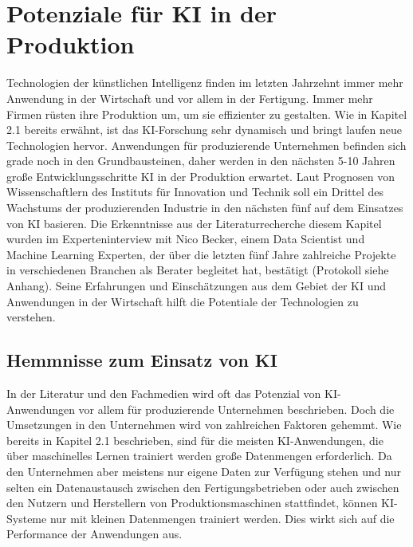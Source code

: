 \documentclass[a4paper,12pt, german]{report}
\begin{document}
\chapter{Potenziale für KI in der Produktion}
Technologien der künstlichen Intelligenz finden im letzten Jahrzehnt immer mehr Anwendung in der Wirtschaft und vor allem in der Fertigung. Immer mehr Firmen rüsten ihre Produktion um, um sie effizienter zu gestalten. Wie in Kapitel 2.1 bereits erwähnt, ist das KI-Forschung sehr dynamisch und bringt laufen neue Technologien hervor. Anwendungen für produzierende Unternehmen befinden sich grade noch in den Grundbausteinen, daher werden in den nächsten 5-10 Jahren große Entwicklungsschritte KI in der Produktion erwartet.\cite{08} 
Laut Prognosen von Wissenschaftlern des Instituts für Innovation und Technik soll ein Drittel des Wachstums der produzierenden Industrie in den nächsten fünf auf dem Einsatzes von KI basieren.\cite{24}
Die Erkenntnisse aus der Literaturrecherche  diesem Kapitel wurden im Experteninterview mit Nico Becker, einem Data Scientist und Machine Learning Experten, der über die letzten fünf Jahre zahlreiche Projekte in verschiedenen Branchen als Berater begleitet hat, bestätigt (Protokoll siehe Anhang). Seine Erfahrungen und Einschätzungen aus dem Gebiet der KI und Anwendungen in der Wirtschaft hilft die Potentiale der Technologien zu verstehen.

\section{Hemmnisse zum Einsatz von KI}
In der Literatur und den Fachmedien wird oft das Potenzial von KI-Anwendungen vor allem für produzierende Unternehmen beschrieben. Doch die Umsetzungen in den Unternehmen wird von zahlreichen Faktoren gehemmt. Wie bereits in Kapitel 2.1 beschrieben, sind für die meisten KI-Anwendungen, die über maschinelles Lernen trainiert werden große Datenmengen erforderlich. Da den Unternehmen aber meistens nur eigene Daten zur Verfügung stehen und nur selten ein Datenaustausch zwischen den Fertigungsbetrieben oder auch zwischen den Nutzern und Herstellern von Produktionsmaschinen stattfindet, können KI-Systeme nur mit kleinen Datenmengen trainiert werden. Dies wirkt sich auf die Performance der Anwendungen aus.
\end{document}

